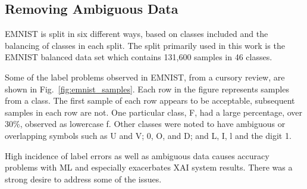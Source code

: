 \documentclass[conference]{IEEEtran}
\begin{document}
\subsection{Removing Ambiguous Data}
\label{method:pruning}

EMNIST is split in six different ways, based on classes included and the
balancing of classes in each split.  The split primarily used in this work is
the EMNIST balanced data set which contains 131,600 samples in 46 classes.



Some of the label problems observed in EMNIST, from a cursory review, are shown in
Fig.~\ref{fig:emnist_samples}. Each row in the figure represents samples from
a class.  The first sample of each row appears to be acceptable,
subsequent samples in each row are not. One particular class, F, had a large
percentage, over 30\%, observed as lowercase f. Other classes were noted to have
ambiguous or overlapping symbols such as U and V; $0$, O, and D; and L, I, l and
the digit 1.

High incidence of label errors as well as ambiguous data causes accuracy
problems with ML and especially exacerbates XAI system results.  There was a
strong desire to address some of the issues.
\end{document}
